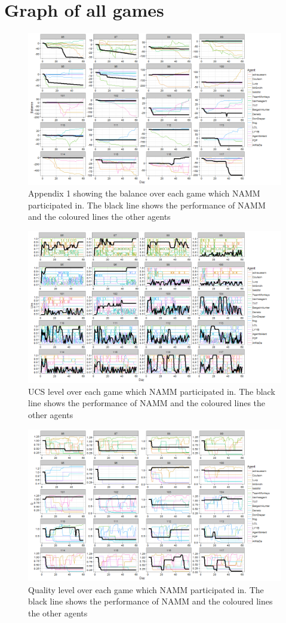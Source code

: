 \documentclass{sig-alternate-05-2015}
\begin{document}
\section{Graph of all games}
\begin{figure}
\centering
\includegraphics[width = .9\linewidth]{appendix1.png}
\caption{Appendix 1 showing the balance over each game which NAMM participated in. The black line shows the performance of NAMM and the coloured lines the other agents}
\label{Appendix1}
\end{figure}
\begin{figure}
\centering
\includegraphics[width = .9\linewidth]{appendix2.png}
\caption{UCS level over each game which NAMM participated in. The black line shows the performance of NAMM and the coloured lines the other agents}
\label{Appendix2}
\end{figure}
\begin{figure}
\centering
\includegraphics[width = .9\linewidth]{appendix3.png}
\caption{Quality level over each game which NAMM participated in. The black line shows the performance of NAMM and the coloured lines the other agents}
\label{Appendix3}
\end{figure}
\end{document}
